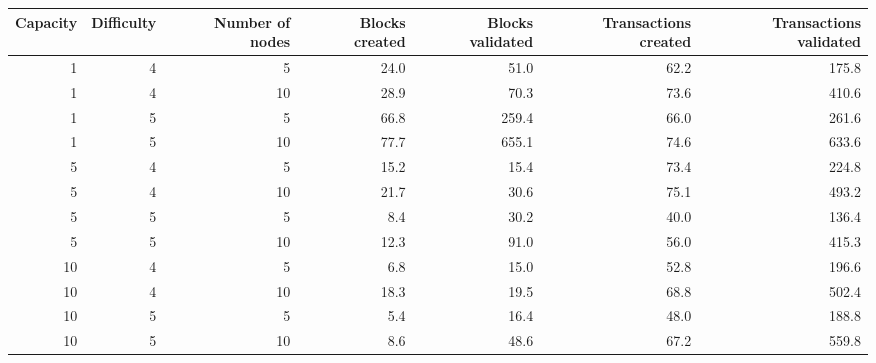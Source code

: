 \begin{tabular}{rrrrrrr}
\toprule
 Capacity &  Difficulty &  Number of nodes &  Blocks created &  Blocks validated &  Transactions created &  Transactions validated \\
\midrule
        1 &           4 &                5 &            24.0 &              51.0 &                  62.2 &                   175.8 \\
        1 &           4 &               10 &            28.9 &              70.3 &                  73.6 &                   410.6 \\
        1 &           5 &                5 &            66.8 &             259.4 &                  66.0 &                   261.6 \\
        1 &           5 &               10 &            77.7 &             655.1 &                  74.6 &                   633.6 \\
        5 &           4 &                5 &            15.2 &              15.4 &                  73.4 &                   224.8 \\
        5 &           4 &               10 &            21.7 &              30.6 &                  75.1 &                   493.2 \\
        5 &           5 &                5 &             8.4 &              30.2 &                  40.0 &                   136.4 \\
        5 &           5 &               10 &            12.3 &              91.0 &                  56.0 &                   415.3 \\
       10 &           4 &                5 &             6.8 &              15.0 &                  52.8 &                   196.6 \\
       10 &           4 &               10 &            18.3 &              19.5 &                  68.8 &                   502.4 \\
       10 &           5 &                5 &             5.4 &              16.4 &                  48.0 &                   188.8 \\
       10 &           5 &               10 &             8.6 &              48.6 &                  67.2 &                   559.8 \\
\bottomrule
\end{tabular}
